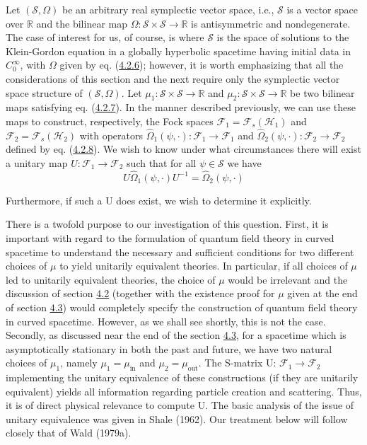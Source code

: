 \documentclass[11pt,a4paper]{article}
\begin{document}
Let \((\mathcal{S},\Omega)\) be an arbitrary real symplectic vector space, i.e., \(\mathcal{S}\) is a vector space over \(\mathbb{R}\) and the bilinear map \(\Omega: \mathcal{S} \times \mathcal{S} \to \mathbb{R}\) is antisymmetric and nondegenerate. The case of interest for us, of course, is where \(\mathcal{S}\) is the space of solutions to the Klein-Gordon equation in a globally hyperbolic spacetime having initial data in \(C_0^\infty\), with \(\Omega\) given by eq. (\hyperref[eq:4.2.6]{4.2.6}); however, it is worth emphasizing that all the considerations of this section and the next require only the symplectic vector space structure of \((\mathcal{S},\Omega)\). Let \(\mu_1:\mathcal{S}\times\mathcal{S}\to\mathbb{R}\) and \(\mu_2:\mathcal{S}\times\mathcal{S}\to\mathbb{R}\) be two bilinear maps satisfying eq. (\hyperref[eq:4.2.7]{4.2.7}). In the manner described previously, we can use these maps to construct, respectively, the Fock spaces \(\mathcal{F}_1=\mathcal{F}_s(\mathcal{H}_1)\) and \(\mathcal{F}_2=\mathcal{F}_s(\mathcal{H}_2)\) with operators \(\widehat{\Omega}_1(\psi,\cdot):\mathcal{F}_1\to\mathcal{F}_1\) and \(\widehat{\Omega}_2(\psi,\cdot):\mathcal{F}_2\to\mathcal{F}_2\) defined by eq. (\hyperref[eq:4.2.8]{4.2.8}). We wish to know under what circumstances there will exist a unitary map \(U:\mathcal{F}_1\to\mathcal{F}_2\) such that for all \(\psi\in\mathcal{S}\) we have
\begin{equation*}
U \hat{\Omega}_1(\psi, \cdot) U^{-1} = \hat{\Omega}_2(\psi, \cdot) \tag{4.4.1}\label{eq:4.4.1}
\end{equation*}

Furthermore, if such a U does exist, we wish to determine it explicitly.

There is a twofold purpose to our investigation of this question. First, it is important with regard to the formulation of quantum field theory in curved spacetime to understand the necessary and sufficient conditions for two different choices of \(\mu\) to yield unitarily equivalent theories. In particular, if all choices of \(\mu\) led to unitarily equivalent theories, the choice of \(\mu\) would be irrelevant and the discussion of section \hyperlink{sec:4.2}{4.2} (together with the existence proof for \(\mu\) given at the end of section \hyperlink{sec:4.3}{4.3}) would completely specify the construction of quantum field theory in curved spacetime. However, as we shall see shortly, this is not the case. Secondly, as discussed near the end of the section \hyperlink{sec:4.3}{4.3}, for a spacetime which is asymptotically stationary in both the past and future, we have two natural choices of \(\mu_1\), namely \(\mu_1 = \mu_{\mathrm{in}}\) and \(\mu_2 = \mu_{\mathrm{out}}\). The S-matrix U: \(\mathcal{F}_1 \rightarrow \mathcal{F}_2\) implementing the unitary equivalence of these constructions (if they are unitarily equivalent) yields all information regarding particle creation and scattering. Thus, it is of direct physical relevance to compute U. The basic analysis of the issue of unitary equivalence was given in Shale (1962). Our treatment below will follow closely that of Wald (1979a).
\end{document}

